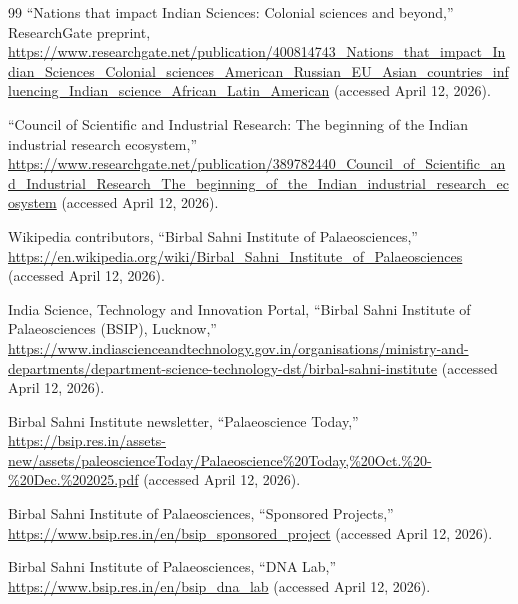 \documentclass[10pt]{article}
\begin{document}
\begin{thebibliography}{99}
``Nations that impact Indian Sciences: Colonial sciences and beyond,'' ResearchGate preprint, \url{https://www.researchgate.net/publication/400814743_Nations_that_impact_Indian_Sciences_Colonial_sciences_American_Russian_EU_Asian_countries_influencing_Indian_science_African_Latin_American} (accessed April 12, 2026).

``Council of Scientific and Industrial Research: The beginning of the Indian industrial research ecosystem,'' \url{https://www.researchgate.net/publication/389782440_Council_of_Scientific_and_Industrial_Research_The_beginning_of_the_Indian_industrial_research_ecosystem} (accessed April 12, 2026).

Wikipedia contributors, ``Birbal Sahni Institute of Palaeosciences,'' \url{https://en.wikipedia.org/wiki/Birbal_Sahni_Institute_of_Palaeosciences} (accessed April 12, 2026).

India Science, Technology and Innovation Portal, ``Birbal Sahni Institute of Palaeosciences (BSIP), Lucknow,'' \url{https://www.indiascienceandtechnology.gov.in/organisations/ministry-and-departments/department-science-technology-dst/birbal-sahni-institute} (accessed April 12, 2026).

Birbal Sahni Institute newsletter, ``Palaeoscience Today,'' \url{https://bsip.res.in/assets-new/assets/paleoscienceToday/Palaeoscience%20Today,%20Oct.%20-%20Dec.%202025.pdf} (accessed April 12, 2026).

Birbal Sahni Institute of Palaeosciences, ``Sponsored Projects,'' \url{https://www.bsip.res.in/en/bsip_sponsored_project} (accessed April 12, 2026).

Birbal Sahni Institute of Palaeosciences, ``DNA Lab,'' \url{https://www.bsip.res.in/en/bsip_dna_lab} (accessed April 12, 2026).

\end{thebibliography}
\end{document}
